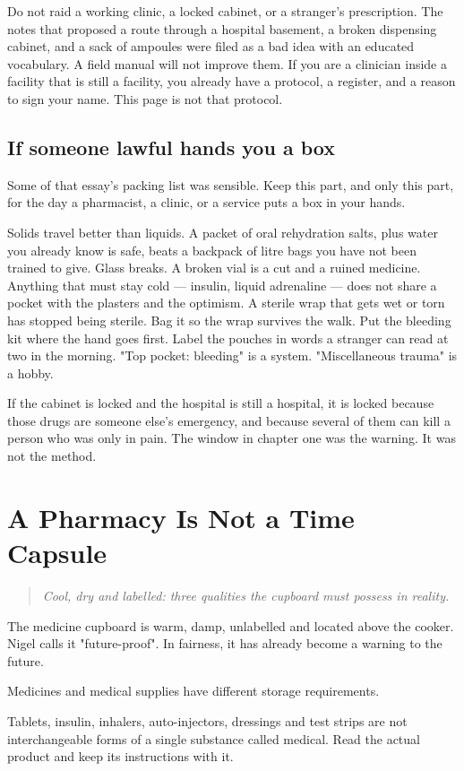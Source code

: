 \documentclass[10pt,openright]{book}
\begin{document}
Do not raid a working clinic, a locked cabinet, or a stranger's prescription. The notes that proposed a route through a hospital basement, a broken dispensing cabinet, and a sack of ampoules were filed as a bad idea with an educated vocabulary. A field manual will not improve them. If you are a clinician inside a facility that is still a facility, you already have a protocol, a register, and a reason to sign your name. This page is not that protocol.

\section*{If someone lawful hands you a box}
Some of that essay's packing list was sensible. Keep this part, and only this part, for the day a pharmacist, a clinic, or a service puts a box in your hands.

Solids travel better than liquids. A packet of oral rehydration salts, plus water you already know is safe, beats a backpack of litre bags you have not been trained to give. Glass breaks. A broken vial is a cut and a ruined medicine. Anything that must stay cold — insulin, liquid adrenaline — does not share a pocket with the plasters and the optimism. A sterile wrap that gets wet or torn has stopped being sterile. Bag it so the wrap survives the walk. Put the bleeding kit where the hand goes first. Label the pouches in words a stranger can read at two in the morning. "Top pocket: bleeding" is a system. "Miscellaneous trauma" is a hobby.

If the cabinet is locked and the hospital is still a hospital, it is locked because those drugs are someone else's emergency, and because several of them can kill a person who was only in pain. The window in chapter one was the warning. It was not the method.

\chapter{A Pharmacy Is Not a Time Capsule}
\begin{quote}\emph{Cool, dry and labelled: three qualities the cupboard must possess in reality.}\end{quote}
The medicine cupboard is warm, damp, unlabelled and located above the cooker. Nigel calls it "future-proof". In fairness, it has already become a warning to the future.

Medicines and medical supplies have different storage requirements.

Tablets, insulin, inhalers, auto-injectors, dressings and test strips are not interchangeable forms of a single substance called medical. Read the actual product and keep its instructions with it.
\end{document}
